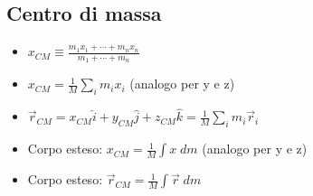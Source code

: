 \documentclass[a4paper,14pt,landscape]{extarticle}
\begin{document}
\begin{multicols*}{2}
    \section*{Centro di massa}
    \begin{itemize}
        \item $x_{CM} \equiv \tfrac{m_1x_1 + \cdots + m_nx_n}{m_1 + \cdots + m_n}$
        \item $x_{CM} = \tfrac{1}{M}\sum_i m_ix_i$ (analogo per y e z)
        \item $\vec{r}_{CM} = x_{CM}\hat{i} + y_{CM}\hat{j} + z_{CM}\hat{k} = \tfrac{1}{M} \sum_i m_i \vec{r}_i$
        \item Corpo esteso: $x_{CM} = \tfrac{1}{M} \int x \; dm$ (analogo per y e z)
        \item Corpo esteso: $\vec{r}_{CM} = \frac{1}{M} \int \vec{r} \; dm$
    \end{itemize}

\end{multicols*}
\end{document}
